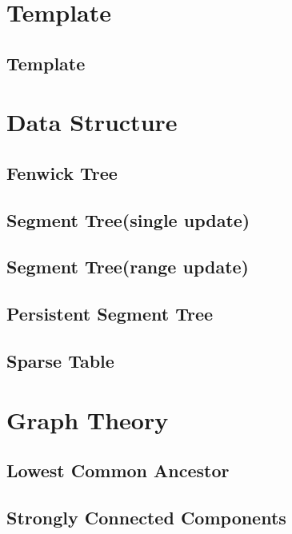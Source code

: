 \section{Template}
\subsection{Template}
\raggedbottom
\hrulefill
\section{Data Structure}
\subsection{Fenwick Tree}
\raggedbottom
\subsection{Segment Tree(single update)}
\raggedbottom
\subsection{Segment Tree(range update)}
\raggedbottom
\subsection{Persistent Segment Tree}
\raggedbottom
\subsection{Sparse Table}
\raggedbottom
\hrulefill
\section{Graph Theory}
\subsection{Lowest Common Ancestor}
\raggedbottom
\subsection{Strongly Connected Components}
\raggedbottom
